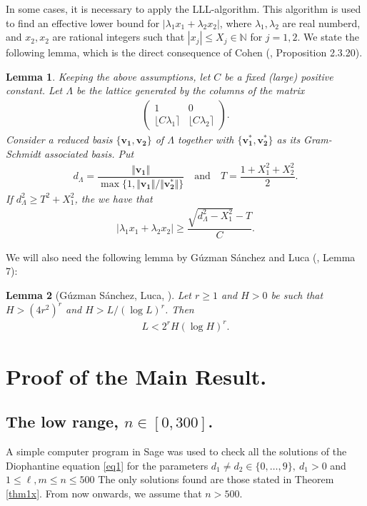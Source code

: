 \documentclass[10pt,a4paper]{article}
\newtheorem{lemma}{Lemma}
\begin{document}
\noindent
In some cases, it is necessary to apply the LLL-algorithm. This algorithm is used to find an effective lower bound for $ |\lambda_1 x_1+\lambda_2 x_2| $, where $ \lambda_1, \lambda_2 $ are real numberd, and $ x_2,x_2 $ are rational integers such that $ |x_j|\le X_j \in \mathbb{N} $ for $ j=1,2 $. We state the following lemma, which is the direct consequence of Cohen (\cite{HC1}, Proposition 2.3.20).
\begin{lemma}\label{LLL}
Keeping the above assumptions, let $ C $ be a fixed (large) positive constant.  Let $ \Lambda $ be the lattice generated by the columns of the matrix
\begin{align*}
\begin{pmatrix}
1 & 0 \\ 
\lfloor C\lambda_1 \rceil & \lfloor C\lambda_2 \rceil
\end{pmatrix} .
\end{align*}
Consider a reduced basis $ \{\mathbf{v_1}, \mathbf{v_2}\} $ of $ \Lambda$ together with $ \{\mathbf{v_1^*}, \mathbf{v_2^*}\}$ as its Gram-Schmidt associated basis. Put
\begin{align*}
d_\Lambda= \dfrac{\Vert \mathbf{v_1} \Vert}{\max\{1,\Vert \mathbf{v_1} \Vert/\Vert \mathbf{v_2^*} \Vert \}} \quad \text{and} \quad T=\dfrac{1+X_1^2+X_2^2}{2}.
\end{align*}
If $ d_\Lambda^2\ge T^2 +X_1^2 $, the we have that
\begin{align*}
 |\lambda_1 x_1+\lambda_2 x_2| \ge \dfrac{\sqrt{d_\Lambda^2-X_1^2}-T}{C}.
\end{align*}
\end{lemma}





\noindent We will also need the following lemma by G\'{u}zman S\'{a}nchez and Luca (\cite{GSL}, Lemma 7):
\begin{lemma}[G\'{u}zman S\'{a}nchez, Luca, \cite{GSL}]\label{l3}
Let $r \geq 1$ and $H > 0$ be such that $H > (4r^2)^r$ and $H > L/(\log L)^r$. Then
\begin{align*}
L < 2^r H (\log H)^r.
\end{align*}
\end{lemma}

\section{Proof of the Main Result.}
\subsection{The low range, $ n\in [0,300] $.}
A simple computer program in Sage was used to check all the solutions of the Diophantine equation \eqref{eq1} for the parameters $ d_1\neq d_2 \in \{0, \ldots, 9\},~ d_1>0 $ and $ 1\le \ell,m \le n\le 500 $ The only solutions found are those stated in Theorem \ref{thm1x}. From now onwards, we assume that $n > 500$.
\end{document}

